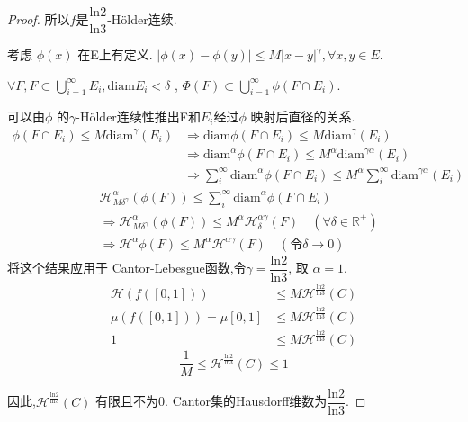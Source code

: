 \documentclass[hyperref,a4paper,UTF8]{ctexart}
\begin{document}
\begin{proof}
所以$f$是$\dfrac{\mathrm{ln}2}{\mathrm{ln}3}$-Hölder连续. 


考虑 $\phi (x)$ 在E上有定义. $\vert \phi (x) - \phi (y) \vert \leqslant M \vert x-y \vert^\gamma,\forall x,y \in E.$ 

$\forall F,F \subset \bigcup\limits_{i=1}^{\infty} E_i, \mathrm{diam}E_i<\delta $ ,
$\Phi(F) \subset \bigcup\limits_{i=1}^{\infty}\phi(F \cap E_i)$. 

可以由$\phi$ 的$\gamma$-Hölder连续性推出F和$E_i$经过$\phi$ 映射后直径的关系. 
\begin{align*}
\phi(F \cap E_i ) \leqslant M \mathrm{diam} ^\gamma (E_i )&\Rightarrow \mathrm{diam} \phi(F \cap E_i) \leqslant M \mathrm{diam} ^\gamma (E_i )\\
&\Rightarrow \mathrm{diam} ^\alpha \phi(F \cap E_i) \leqslant M^{\alpha} \mathrm{diam} ^{\gamma\alpha} (E_i )\\
&\Rightarrow \sum_i^{\infty}\mathrm{diam} ^\alpha \phi(F \cap E_i)\leqslant M^{\alpha} \sum_i^{\infty} \mathrm{diam} ^{\gamma\alpha} (E_i )
\end{align*}
\begin{align*}
&\mathcal{H}^\alpha_{M \delta^\gamma} (\phi(F)) \leqslant   \sum_i^{\infty}\mathrm{diam} ^\alpha \phi(F \cap E_i) \\
& \Rightarrow \mathcal{H}^\alpha_{M \delta^\gamma} (\phi(F)) \leqslant M^{\alpha} \mathcal{H}^{\alpha\gamma }_\delta(F) \quad (\forall \delta \in \mathbb{R}^{+})\\
& \Rightarrow \mathcal{H}^\alpha{\phi(F)} \leqslant M^{\alpha} \mathcal{H}^{\alpha\gamma }(F) \quad (令 \delta \rightarrow 0)
\end{align*}
将这个结果应用于 Cantor-Lebesgue函数,令$\gamma = \dfrac{\mathrm{ln}2}{\mathrm{ln}3}$,
取 $\alpha = 1$.
\begin{align*}
\mathcal{H}(f([0,1])) & \leqslant M \mathcal{H}^{\frac{ \mathrm{ln}2}{ \mathrm{ln}3}}(C)\\
\mu(f([0,1])) = \mu{[0,1]} & \leqslant M \mathcal{H}^{\frac{ \mathrm{ln}2}{ \mathrm{ln}3}}(C)\\
1 & \leqslant M \mathcal{H}^{\frac{ \mathrm{ln}2}{ \mathrm{ln}3}}(C)
\end{align*} 
\[
\frac{1}{M } \leqslant \mathcal{H}^{\frac{ \mathrm{ln}2}{ \mathrm{ln}3}}(C) \leqslant 1
\]

因此,$\mathcal{H}^{\frac{ \mathrm{ln}2}{ \mathrm{ln}3}}(C)$ 有限且不为0. Cantor集的Hausdorff维数为$\dfrac{\mathrm{ln}2}{\mathrm{ln}3}$.

\text{\textcolor{red}{tips:在前文中应该叙述清楚Hausdorff维数的定义和性质.}}
\end{proof}
\end{document}
